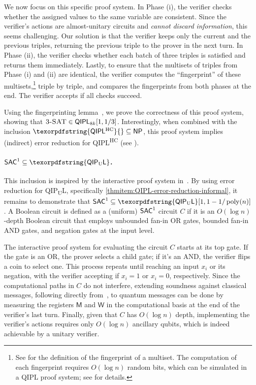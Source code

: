 \documentclass[10pt,a4paper]{article}
\numberwithin{equation}{section}
\numberwithin{figure}{section}
\newcommand{\NP}{\textnormal{\textsf{NP}}\xspace}
\newcommand{\QIPL}{\textnormal{\textsf{QIPL}}\xspace}
\newcommand{\QIPUL}{\texorpdfstring{\textnormal{\textsf{QIP}\textsubscript{\textnormal{U}}\textsf{L}}}\xspace}
\newcommand{\QIPLHC}{\texorpdfstring{\textnormal{\textsf{QIPL}\textsuperscript{\textnormal{HC}}}}\xspace}
\newcommand{\SAC}{\textnormal{\textsf{SAC}}\xspace}
\newcommand{\threeSAT}{\textnormal{\textsc{3-SAT}}\xspace}
\DeclareMathOperator\poly{poly}
\newcommand{\sfM}{\mathsf{M}}
\newcommand{\sfW}{\mathsf{W}}
\begin{document}
We now focus on this specific proof system. In Phase (i), the verifier checks whether the assigned values to the same variable are consistent. Since the verifier's actions are almost-unitary circuits and \textit{cannot discard information}, this seems challenging. Our solution is that the verifier keeps only the current and the previous triples, returning the previous triple to the prover in the next turn. In Phase (ii), the verifier checks whether each batch of three triples is satisfied and returns them immediately. 
Lastly, to ensure that the multisets of triples from Phase (i) and (ii) are identical, the verifier computes the ``fingerprint'' of these multisets,\footnote{See  for the definition of the fingerprint of a multiset. The computation of each fingerprint requires $O(\log n)$ random bits, which can be simulated in a \QIPL{} proof system; see  for details.} triple by triple, and compares the fingerprints from both phases at the end. 
The verifier accepts if all checks succeed. 

Using the fingerprinting lemma~\cite{Lipton90}, we prove the correctness of this proof system, showing that $\threeSAT{} \in \QIPL_{8k}[1,1/3]$. 
Interestingly, when combined with the inclusion $\QIPLHC{} \subseteq \NP{}$, this proof system implies (indirect) error reduction for \QIPLHC{} (see ). 

\paragraph{$\SAC^1 \subseteq \QIPUL$.} This inclusion is inspired by the interactive proof system in~\cite[Section 3.4]{Fortnow89}. By using error reduction for \QIPUL{}, specifically \ref{thmitem:QIPL-error-reduction-informal}, it remains to demonstrate that $\SAC^1 \subseteq \QIPUL[1,1-1/\poly(n)]$. 
A Boolean circuit is defined as a (uniform) $\SAC^1$ circuit $C$ if it is an $O(\log{n})$-depth Boolean circuit that employs unbounded fan-in OR gates, bounded fan-in AND gates, and negation gates at the input level. 

The interactive proof system for evaluating the circuit $C$ starts at its top gate. If the gate is an OR, the prover selects a child gate; if it's an AND, the verifier flips a coin to select one. This process repeats until reaching an input $x_i$ or its negation, with the verifier accepting if $x_i=1$ or $x_i=0$, respectively.
Since the computational paths in $C$ do not interfere, extending soundness against classical messages, following directly from~\cite[Section 3.4]{Fortnow89}, to quantum messages can be done by measuring the registers $\sfM$ and $\sfW$ in the computational basis at the end of the verifier's last turn. Finally, given that $C$ has $O(\log{n})$ depth, implementing the verifier's actions requires only $O(\log n)$ ancillary qubits, which is indeed achievable by a unitary verifier. 
\end{document}
